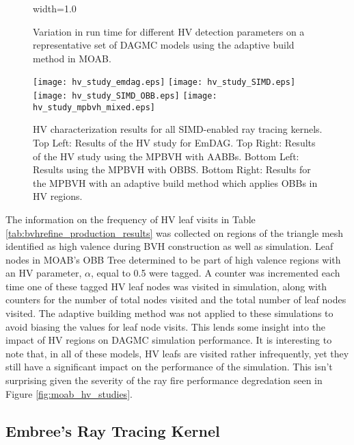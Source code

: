 \begin{figure}[H]
  \centering
  {width=1.0\textwidth}
  \caption[High valence detection parameter study.]{Variation in run time for
    different HV detection parameters on a representative set of DAGMC models
    using the adaptive build method in MOAB.}
  \label{fig:hv_parameter_study_moab}
\end{figure}


\begin{sidewaysfigure}
  \centering
  \texttt{[image: hv\_study\_emdag.eps]}
  \texttt{[image: hv\_study\_SIMD.eps]}
  \texttt{[image: hv\_study\_SIMD\_OBB.eps]}
  \texttt{[image: hv\_study\_mpbvh\_mixed.eps]}
  \caption[HV characterization studies using EmDAG and MPBVH.]{HV characterization results for all SIMD-enabled ray tracing
    kernels. Top Left: Results of the HV study for EmDAG. Top Right: Results of
    the HV study using the MPBVH with AABBs. Bottom Left: Results using the
    MPBVH with OBBS. Bottom Right: Results for the MPBVH with an adaptive build
    method which applies OBBs in HV regions.}
  \label{fig:simd_hv_studies}
\end{sidewaysfigure}

The information on the frequency of HV leaf visits in Table
\ref{tab:bvhrefine_production_results} was collected on regions of the triangle
mesh identified as high valence during BVH construction as well as
simulation. Leaf nodes in MOAB's OBB Tree determined to be part of high valence
regions with an HV parameter, $\alpha$, equal to 0.5 were tagged. A counter was
incremented each time one of these tagged HV leaf nodes was visited in
simulation, along with counters for the number of total nodes visited and the
total number of leaf nodes visited. The adaptive building method was not applied
to these simulations to avoid biasing the values for leaf node visits. This
lends some insight into the impact of HV regions on DAGMC simulation
performance. It is interesting to note that, in all of these models, HV leafs are
visited rather infrequently, yet they still have a significant impact on the
performance of the simulation. This isn't surprising given the severity of the
ray fire performance degredation seen in Figure \ref{fig:moab_hv_studies}.

\subsection{Embree's Ray Tracing Kernel}\label{sec:emdag_hv_study}

